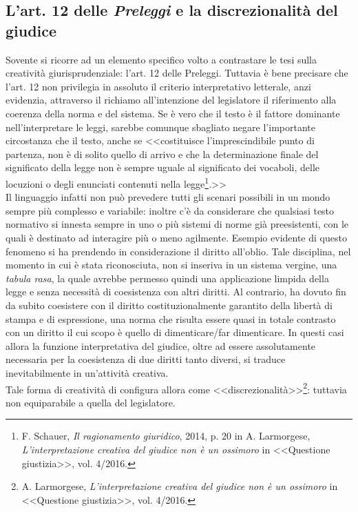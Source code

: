 \subsection{L'art. 12 delle \textit{Preleggi} e la discrezionalità del giudice}
Sovente si ricorre ad un elemento specifico volto a contrastare le tesi sulla creatività giurisprudenziale: l'art. 12 delle Preleggi. Tuttavia è bene precisare che l'art. 12 non privilegia in assoluto il criterio interpretativo letterale, anzi evidenzia, attraverso il richiamo all'intenzione del legislatore il riferimento alla coerenza della norma e del sistema.
Se è vero che il testo è il fattore dominante nell'interpretare le leggi, sarebbe comunque sbagliato negare l'importante circostanza che il testo, anche se <<costituisce l'imprescindibile punto di partenza, non è di solito quello di arrivo e che la determinazione finale del significato della legge non è sempre uguale al significato dei vocaboli, delle locuzioni o degli enunciati contenuti nella legge\footnote{F. Schauer, \textit{Il ragionamento giuridico}, 2014, p. 20 in A. Larmorgese, \textit{L’interpretazione creativa del giudice non è un ossimoro} in <<Questione giustizia>>, vol. 4/2016.}.>>
\\Il linguaggio infatti non può prevedere tutti gli scenari possibili in un mondo sempre più complesso e variabile: inoltre c'è da considerare che qualsiasi testo normativo si innesta sempre in uno o più sistemi di norme già preesistenti, con le quali è destinato ad interagire più o meno agilmente. Esempio evidente di questo fenomeno si ha prendendo in considerazione il diritto all'oblio. Tale disciplina, nel momento in cui è stata riconosciuta, non si inseriva in un sistema vergine, una \textit{tabula rasa}, la quale avrebbe permesso quindi una applicazione limpida della legge e senza necessità di coesistenza con altri diritti. Al contrario, ha dovuto fin da subito coesistere con il diritto costituzionalmente garantito della libertà di stampa e di espressione, una norma che risulta essere quasi in totale contrasto con un diritto il cui scopo è quello di dimenticare/far dimenticare.
In questi casi allora la funzione interpretativa del giudice, oltre ad essere assolutamente necessaria per la coesistenza di due diritti tanto diversi, si traduce inevitabilmente in un'attività creativa.
\\Tale forma di creatività di configura allora come <<discrezionalità>>\footnote{A. Larmorgese, \textit{L’interpretazione creativa del giudice non è un ossimoro} in <<Questione giustizia>>, vol. 4/2016.}: tuttavia non equiparabile a quella del legislatore.
